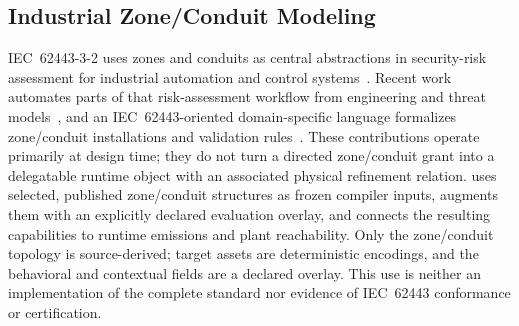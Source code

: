 \subsection{Industrial Zone/Conduit Modeling}

IEC~62443-3-2 uses zones and conduits as central abstractions in security-risk assessment for industrial automation and control systems~\cite{iec62443}. Recent work automates parts of that risk-assessment workflow from engineering and threat models~\cite{dasilva2025}, and an IEC~62443-oriented domain-specific language formalizes zone/conduit installations and validation rules~\cite{vaudey2024}. These contributions operate primarily at design time; they do not turn a directed zone/conduit grant into a delegatable runtime object with an associated physical refinement relation. \zonecap{} uses selected, published zone/conduit structures as frozen compiler inputs, augments them with an explicitly declared evaluation overlay, and connects the resulting capabilities to runtime emissions and plant reachability. Only the zone/conduit topology is source-derived; target assets are deterministic encodings, and the behavioral and contextual fields are a declared overlay. This use is neither an implementation of the complete standard nor evidence of IEC~62443 conformance or certification.

